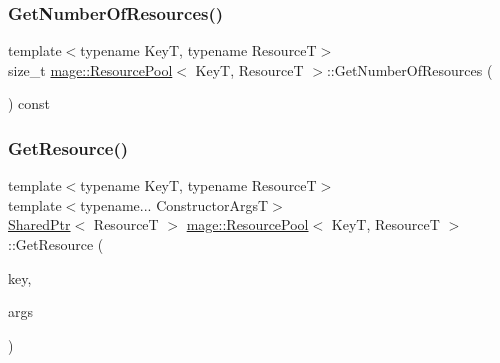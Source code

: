 \hypertarget{classmage_1_1_resource_pool_ae2f9964a1821c9b8cb38303a5a88c98e}{}\label{classmage_1_1_resource_pool_ae2f9964a1821c9b8cb38303a5a88c98e} 
\subsubsection{\texorpdfstring{Get\+Number\+Of\+Resources()}{GetNumberOfResources()}}
{\footnotesize\ttfamily template$<$typename KeyT, typename ResourceT$>$ \\
size\+\_\+t \hyperlink{classmage_1_1_resource_pool}{mage\+::\+Resource\+Pool}$<$ KeyT, ResourceT $>$\+::Get\+Number\+Of\+Resources (\begin{DoxyParamCaption}{ }\end{DoxyParamCaption}) const}

\hypertarget{classmage_1_1_resource_pool_add76506394983fe84bc2cb95cfd5f7e2}{}\label{classmage_1_1_resource_pool_add76506394983fe84bc2cb95cfd5f7e2} 
\subsubsection{\texorpdfstring{Get\+Resource()}{GetResource()}}
{\footnotesize\ttfamily template$<$typename KeyT, typename ResourceT$>$ \\
template$<$typename... Constructor\+ArgsT$>$ \\
\hyperlink{namespacemage_a1e01ae66713838a7a67d30e44c67703e}{Shared\+Ptr}$<$ ResourceT $>$ \hyperlink{classmage_1_1_resource_pool}{mage\+::\+Resource\+Pool}$<$ KeyT, ResourceT $>$\+::Get\+Resource (\begin{DoxyParamCaption}\item[{KeyT}]{key,  }\item[{Constructor\+ArgsT \&\&...}]{args }\end{DoxyParamCaption})}

\hypertarget{classmage_1_1_resource_pool_ae8121e031efe9f98605e478b01b19d33}{}\label{classmage_1_1_resource_pool_ae8121e031efe9f98605e478b01b19d33} 

